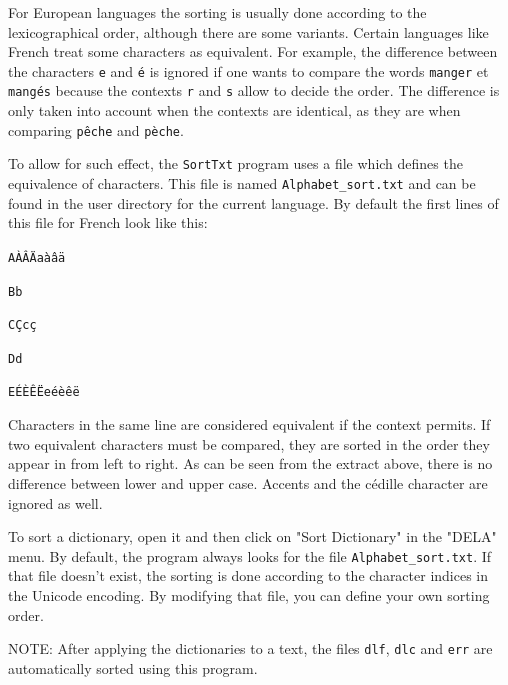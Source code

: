\bigskip
\noindent For European languages the sorting is usually done according to the
lexicographical order, although there are some variants. Certain languages like
French treat some characters as equivalent. For example, the difference between
the characters  \verb+e+  and \texttt{\'e}  is ignored if one wants to compare
the words \verb+manger+ et \texttt{mang\'es} because the contexts
\verb+r+ and \verb+s+ allow to decide the order. The difference is only taken 
into account when the contexts are
identical, as they are when comparing \texttt{p\^eche} and
\texttt{p\`eche}.

\bigskip {}
\noindent
To allow for such effect, the \verb+SortTxt+ program  
 uses a file which
defines the equivalence of characters.   This file
is named \verb+Alphabet_sort.txt+  and can
be found in the user directory for the current language. By default the first
lines of this file for French look like this:

\bigskip
\noindent
\texttt{A\`A\^A\"Aa\`a\^a\"a}

\noindent
\texttt{Bb}

\noindent
\texttt{C\c{C}c\c{c}}

\noindent
\texttt{Dd}

\noindent
\texttt{E\'E\`E\^E\"Ee\'e\`e\^e\"e}


\bigskip
\noindent Characters in the same line are considered equivalent if the context permits. If
two equivalent characters must be compared, they are sorted in the order they
appear in from left to right. As can be seen from the extract above, there is no
difference between lower and upper case. Accents and the c\'edille character are
ignored as well.

\bigskip
\noindent To sort a dictionary, open it and then click on "Sort Dictionary" in
 the "DELA" menu. By default, the program always looks for the file
\verb+Alphabet_sort.txt+. If that file doesn't exist, the sorting is done
according to the character indices in the Unicode encoding. By modifying that
file, you can define your own sorting order.

\bigskip
\noindent NOTE: After applying the dictionaries to a text, the files
\verb+dlf+, \verb+dlc+ and \verb+err+ are automatically sorted using this
program.  



